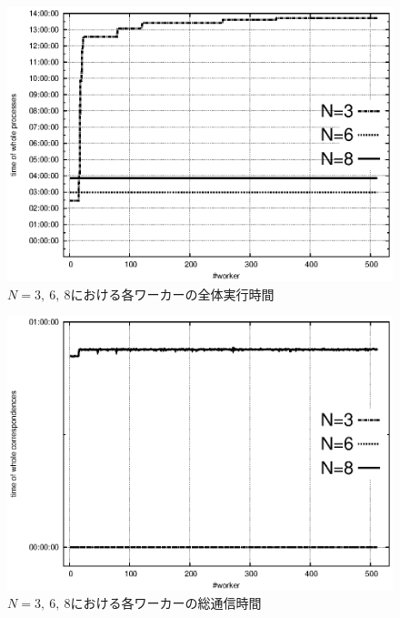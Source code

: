 \begin{figure}[htb]
		\begin{center}
\includegraphics{exp4-2-tie.eps}
		\end{center}
		\caption{$N=3, \ 6, \ 8$における各ワーカーの全体実行時間}
		\label{pic:time4all-process}
\end{figure}
\begin{figure}[htb]
		\begin{center}
\includegraphics{exp4-2-tic.eps}
		\end{center}
		\caption{$N=3, \ 6, \ 8$における各ワーカーの総通信時間}
		\label{pic:time4all-only-correspondence}
\end{figure}
